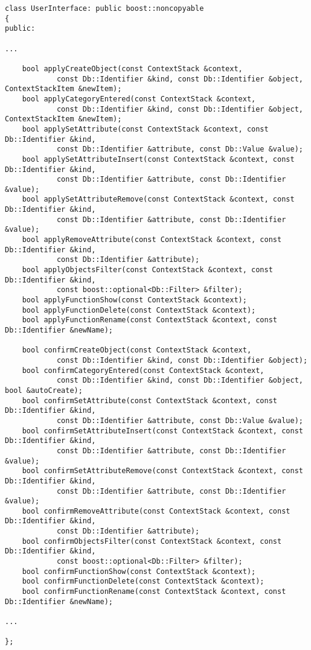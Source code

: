 \documentclass[deska]{subfiles}
\begin{document}
\begin{verbatim}
class UserInterface: public boost::noncopyable
{
public:

...

    bool applyCreateObject(const ContextStack &context,
            const Db::Identifier &kind, const Db::Identifier &object, ContextStackItem &newItem);
    bool applyCategoryEntered(const ContextStack &context,
            const Db::Identifier &kind, const Db::Identifier &object, ContextStackItem &newItem);
    bool applySetAttribute(const ContextStack &context, const Db::Identifier &kind,
            const Db::Identifier &attribute, const Db::Value &value);
    bool applySetAttributeInsert(const ContextStack &context, const Db::Identifier &kind,
            const Db::Identifier &attribute, const Db::Identifier &value);
    bool applySetAttributeRemove(const ContextStack &context, const Db::Identifier &kind,
            const Db::Identifier &attribute, const Db::Identifier &value);
    bool applyRemoveAttribute(const ContextStack &context, const Db::Identifier &kind,
            const Db::Identifier &attribute);
    bool applyObjectsFilter(const ContextStack &context, const Db::Identifier &kind,
            const boost::optional<Db::Filter> &filter);
    bool applyFunctionShow(const ContextStack &context);
    bool applyFunctionDelete(const ContextStack &context);
    bool applyFunctionRename(const ContextStack &context, const Db::Identifier &newName);

    bool confirmCreateObject(const ContextStack &context,
            const Db::Identifier &kind, const Db::Identifier &object);
    bool confirmCategoryEntered(const ContextStack &context,
            const Db::Identifier &kind, const Db::Identifier &object, bool &autoCreate);
    bool confirmSetAttribute(const ContextStack &context, const Db::Identifier &kind,
            const Db::Identifier &attribute, const Db::Value &value);
    bool confirmSetAttributeInsert(const ContextStack &context, const Db::Identifier &kind,
            const Db::Identifier &attribute, const Db::Identifier &value);
    bool confirmSetAttributeRemove(const ContextStack &context, const Db::Identifier &kind,
            const Db::Identifier &attribute, const Db::Identifier &value);
    bool confirmRemoveAttribute(const ContextStack &context, const Db::Identifier &kind,
            const Db::Identifier &attribute);
    bool confirmObjectsFilter(const ContextStack &context, const Db::Identifier &kind,
            const boost::optional<Db::Filter> &filter);
    bool confirmFunctionShow(const ContextStack &context);
    bool confirmFunctionDelete(const ContextStack &context);
    bool confirmFunctionRename(const ContextStack &context, const Db::Identifier &newName);

...

};
\end{verbatim}
\end{document}
